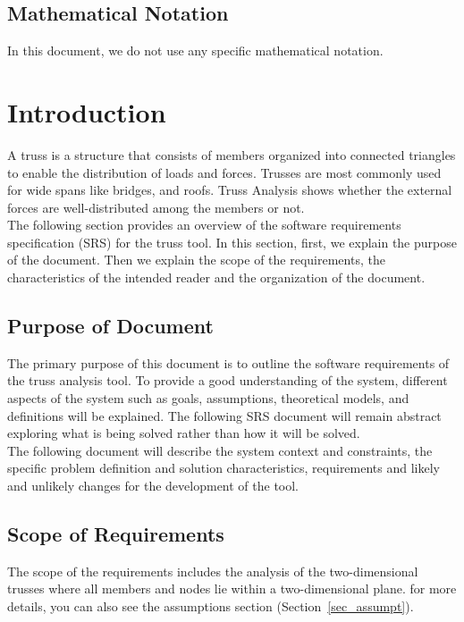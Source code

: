 \documentclass[12pt]{article}
\begin{document}
\subsection{Mathematical Notation}
In this document, we do not use any specific mathematical notation.

\newpage


\section{Introduction}
{A truss is a structure that consists of members organized into connected triangles to enable the distribution of loads and forces. Trusses are most commonly used for wide spans like bridges, and roofs. Truss Analysis shows whether the external forces are well-distributed among the members or not. \\
The following section provides an overview of the software requirements specification (SRS) for the truss tool. In this section, first, we explain the purpose of the document. Then we explain the scope of the requirements, the characteristics of the intended reader and the organization of the document.
}

\subsection{Purpose of Document}
{The primary purpose of this document is to outline the software requirements of the truss analysis tool. To provide a good understanding of the system, different aspects of the system such as  goals, assumptions, theoretical models, and definitions will be explained.  The following SRS document will remain abstract exploring what is being solved rather than how it will be solved.\\
The following document will describe the system context and constraints, the specific problem definition and solution characteristics, requirements and likely and unlikely changes for the 
development of the tool.}

\subsection{Scope of Requirements} 
{The scope of the requirements includes the analysis of the two-dimensional trusses where all members and nodes lie within a two-dimensional plane. for more details, you can also see the assumptions section  (Section~\ref{sec_assumpt}). }
\end{document}

